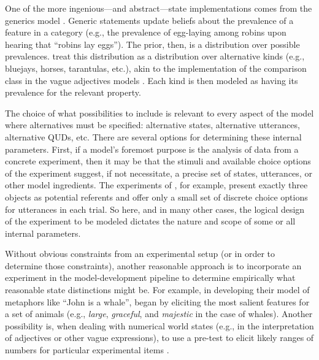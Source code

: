 \documentclass[10pt,letterpaper]{article}
\begin{document}
One of the more ingenious---and abstract---state implementations comes from the generics model \cite{tesslergoodman2019}. Generic statements update beliefs about the prevalence of a feature in a category (e.g., the prevalence of egg-laying among robins upon hearing that ``robins lay eggs''). The prior, then, is a distribution over possible prevalences. \cite{tesslergoodman2019} treat this distribution as a distribution over alternative kinds (e.g., bluejays, horses, tarantulas, etc.), akin to the implementation of the comparison class in the vague adjectives models \cite{lassitergoodman2013, tessler2017comparisonclass}. Each kind is then modeled as having its prevalence for the relevant property.

The choice of what possibilities to include is relevant to every aspect of the model where alternatives must be specified: alternative states, alternative utterances, alternative QUDs, etc.
There are several options for determining these internal parameters.
First, if a model's foremost purpose is the analysis of data from a concrete experiment, then it may be that the stimuli and available choice options of the experiment suggest, if not necessitate, a precise set of states, utterances, or other model ingredients.
The experiments of \cite{frankgoodman2012}, for example, present exactly three objects as potential referents and offer only a small set of discrete choice options for utterances in each trial.
So here, and in many other cases, the logical design of the experiment to be modeled dictates the nature and scope of some or all internal parameters.

Without obvious constraints from an experimental setup (or in order to determine those constraints), another reasonable approach is to incorporate an experiment in the model-development pipeline to determine empirically what reasonable state distinctions might be. For example, in developing their model of metaphors like ``John is a whale'', \cite{kaoetal2014metaphor} began by eliciting the most salient features for a set of animals (e.g., \emph{large}, \emph{graceful}, and \emph{majestic} in the case of whales).
Another possibility is, when dealing with numerical world states (e.g., in the interpretation of adjectives or other vague expressions), to use a pre-test to elicit likely ranges of numbers for particular experimental items \cite{FrankeScholler2016:Semantic-values}.
\end{document}
